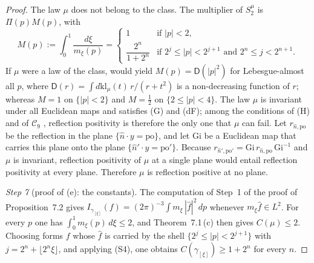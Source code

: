 \documentclass[11pt,letterpaper,reqno]{amsart}
\theoremstyle{definition}
\begin{document}
\begin{proof}
The law $\mu$ does not belong to the class.
The multiplier of $S_2^\mu$ is $\Pi(p)M(p)$, with
\begin{equation*}
M(p):=\int_0^1\frac{d\xi}{m_\xi(p)}=
\begin{cases}
1&\text{if }|p|<2,\\
\dfrac{2^n}{1+2^n}&\text{if }2^j\le|p|<2^{j+1}\text{ and }2^n\le j<2^{n+1}.
\end{cases}
\end{equation*}
If $\mu$ were a law of the class, \cite[Theorem~1.4, Part~I\,(d), (f)]{QEDII} would yield $M(p)=\mathsf D(|p|^2)$ for Lebesgue-almost all $p$, where $\mathsf D(r)=\int d\mathrm{kl}_\mu(t)\,r/(r+t^2)$ is a non-decreasing function of $r$;
whereas $M=1$ on $\{|p|<2\}$ and $M=\frac12$ on $\{2\le|p|<4\}$.
The law $\mu$ is invariant under all Euclidean maps and satisfies (G) and (dF);
among the conditions of (H) and of $\mathcal C_9$ \cite[(n3)]{QEDIII}, reflection positivity is therefore the only one that $\mu$ can fail.
Let $r_{\hat n,\mathrm{po}}$ be the reflection in the plane $\{\hat n\cdot y=\mathrm{po}\}$,
and let $\mathrm{Gi}$ be a Euclidean map that carries this plane onto the plane $\{\hat n'\cdot y=\mathrm{po}'\}$.
Because $r_{\hat n',\mathrm{po}'}=\allowbreak \mathrm{Gi}\,\allowbreak r_{\hat n,\mathrm{po}}\,\allowbreak \mathrm{Gi}^{-1}$ and $\mu$ is invariant, reflection positivity of $\mu$ at a single plane would entail reflection positivity at every plane.
Therefore $\mu$ is reflection positive at no plane.

\emph{Step 7} (proof of (e): the constants).
The computation of Step~1 of the proof of Proposition~7.2 gives $I_{\gamma_{[\xi]}}(f)=(2\pi)^{-3}\int m_\xi\,|\hat f|^2\,dp$ whenever $m_\xi\hat f\in L^2$.
For every $p$ one has $\int_0^1m_\xi(p)\,d\xi\le2$,
and Theorem~7.1\,(c) then gives $C(\mu)\le2$.
Choosing forms $f$ whose $\hat f$ is carried by the shell $\{2^j\le|p|<2^{j+1}\}$ with $j=2^n+\lfloor2^n\xi\rfloor$, and applying (S4), one obtains $C(\gamma_{[\xi]})\ge1+2^n$ for every $n$.
\end{proof}
\end{document}

